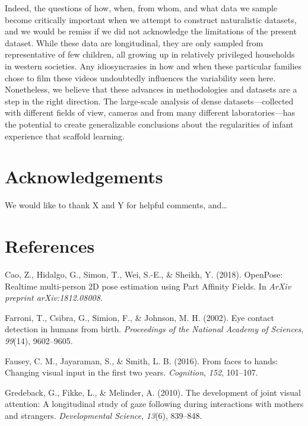 \documentclass[10pt, letterpaper]{article}
\begin{document}
Indeed, the questions of how, when, from whom, and what data we sample
become critically important when we attempt to construct naturalistic
datasets, and we would be remiss if we did not acknowledge the
limitations of the present dataset. While these data are longitudinal,
they are only sampled from representative of few children, all growing
up in relatively privileged households in western societies. Any
idiosyncrasies in how and when these particular families chose to film
these videos undoubtedly influences the variability seen here.
Nonetheless, we believe that these advances in methodologies and
datasets are a step in the right direction. The large-scale analysis of
dense datasets---collected with different fields of view, cameras and
from many different laboratories---has the potential to create
generalizable conclusions about the regularities of infant experience
that scaffold learning.

\section{Acknowledgements}\label{acknowledgements}

We would like to thank X and Y for helpful comments, and\ldots{}

\section{References}\label{references}

\setlength{\parindent}{-0.1in} \setlength{\leftskip}{0.125in} \noindent

\hypertarget{refs}{}
\hypertarget{ref-Cao2018openpose}{}
Cao, Z., Hidalgo, G., Simon, T., Wei, S.-E., \& Sheikh, Y. (2018).
OpenPose: Realtime multi-person 2D pose estimation using Part Affinity
Fields. In \emph{ArXiv preprint arXiv:1812.08008}.

\hypertarget{ref-Farroni2002}{}
Farroni, T., Csibra, G., Simion, F., \& Johnson, M. H. (2002). Eye
contact detection in humans from birth. \emph{Proceedings of the
National Academy of Sciences}, \emph{99}(14), 9602--9605.

\hypertarget{ref-Fausey2016}{}
Fausey, C. M., Jayaraman, S., \& Smith, L. B. (2016). From faces to
hands: Changing visual input in the first two years. \emph{Cognition},
\emph{152}, 101--107.

\hypertarget{ref-Gredeback2010}{}
Gredeback, G., Fikke, L., \& Melinder, A. (2010). The development of
joint visual attention: A longitudinal study of gaze following during
interactions with mothers and strangers. \emph{Developmental Science},
\emph{13}(6), 839--848.
\end{document}
